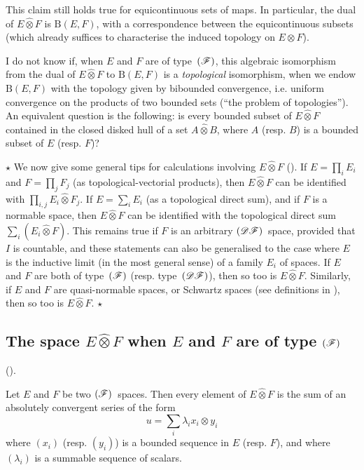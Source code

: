\documentclass{article}
\theoremstyle{plain}
\newenvironment{theorem}[1]
    {\renewcommand\theinnercustomtheorem{#1}\innercustomtheorem}
    {\endinnercustomtheorem}
\newcommand{\aster}[1]{$\star${#1}$\star$}
\newcommand{\BB}{\mathrm{B}}
\newcommand{\DF}{\mbox{\normalfont($\mathscr{DF}$)}}
\newcommand{\FF}{\mbox{\normalfont($\mathscr{F}$)}}
\newcommand{\hotimes}{\widehat{\otimes}}
\newcommand{\oldpage}[1]{\marginpar{\footnotesize$\Big\vert$ \textit{p.~#1}}}
\begin{document}
This claim still holds true for equicontinuous sets of maps.
In particular, the dual of $E\hotimes F$ is $\BB(E,F)$, with a correspondence between the equicontinuous subsets (which already suffices to characterise the induced topology on $E\otimes F$).

I do not know if, when $E$ and $F$ are of type~$\FF$, this algebraic isomorphism from the dual of $E\hotimes F$ to $\BB(E,F)$ is a \emph{topological} isomorphism, when we endow $\BB(E,F)$ with the topology given by bibounded convergence, i.e. uniform convergence on the products of two bounded sets (``the problem of topologies'').
An equivalent question is the following:
is every bounded subset of $E\hotimes F$ contained in the closed disked hull of a set $A\hotimes B$, where $A$ (resp. $B$) is a bounded subset of $E$ (resp. $F$)?

\aster{%
  We now give some general tips for calculations involving $E\hotimes F$ (\cite[chap.~I, \S1, n\textsuperscript{o}~3]{PTT}).
  If $E=\prod_i E_i$ and $F=\prod_j F_j$ (as topological-vectorial products), then $E\hotimes F$ can be identified with $\prod_{i,j}E_i\hotimes F_j$.
  If $E=\sum_i E_i$ (as a topological direct sum), and if $F$ is a normable space, then $E\hotimes F$ can be identified with the topological direct sum $\sum_i(E_i\hotimes F)$.
  This remains true if $F$ is an arbitrary $\DF$~space, provided that $I$ is countable, and these statements can also be generalised to the case where $E$ is the inductive limit (in the most general sense) of a family $E_i$ of spaces.
  If $E$ and $F$ are both of type~$\FF$ (resp. type~$\DF$), then so too is $E\hotimes F$.
  Similarly, if $E$ and $F$ are quasi-normable spaces, or Schwartz spaces (see definitions in \cite[\S3]{6}), then so too is $E\hotimes F$.
}

\oldpage{78}
\subsection{The space \texorpdfstring{$E\hotimes F$}{EF} when \texorpdfstring{$E$}{E} and \texorpdfstring{$F$}{F} are of type \texorpdfstring{$\FF$}{(F)}}
\label{subsection:E-hotimes-F-type-FF}

(\cite[chap.~1, \S2, n\textsuperscript{o}~1]{PTT}).
\medskip

\begin{theorem}{2}
\label{theorem2}
  Let $E$ and $F$ be two $\FF$~spaces.
  Then every element of $E\hotimes F$ is the sum of an absolutely convergent series of the form
  \[
    u = \sum_i \lambda_i x_i \otimes y_i
  \]
  where $(x_i)$ (resp. $(y_i)$) is a bounded sequence in $E$ (resp. $F$), and where $(\lambda_i)$ is a summable sequence of scalars.
\end{theorem}
\end{document}
